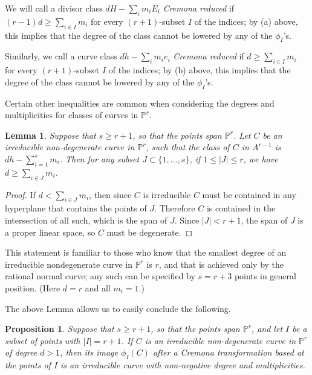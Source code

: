 \documentclass[12pt]{article}
\numberwithin{equation}{section}
\newtheorem{lemma}[equation]{Lemma}
\newtheorem{proposition}[equation]{Proposition}
\numberwithin{equation}{section}
\numberwithin{subeq}{equation}
\def\bbP{\mathbb{P}}
\begin{document}
We will call a divisor class $dH-\sum_i m_i E_i$ \emph{Cremona reduced}
if $(r-1)d \geq \sum_{i \in I} m_i$ for every $(r+1)$-subset $I$ of the indices;
by (a) above, this implies that the degree of the class cannot be lowered
by any of the $\phi_I$'s.

Similarly, we call a curve class $dh-\sum_i m_i e_i$ \emph{Cremona reduced}
if $d \geq \sum_{i \in I} m_i$ for every $(r+1)$-subset $I$ of the indices;
by (b) above, this implies that the degree of the class cannot be lowered
by any of the $\phi_I$'s.

Certain other inequalities are common
when considering the degrees and multiplicities for classes of curves in $\bbP^r$.

\begin{lemma}\label{irrednondeg}
Suppose that $s \geq r+1$,
so that the points span $\bbP^r$.
Let $C$ be an irreducible non-degenerate curve in $\bbP^r$,
such that the class of $C$ in $A^{r-1}$ is $dh-\sum_{i=1}^s m_i$.
Then for any subset $J \subset \{1,\ldots,s\}$, if $1 \leq |J| \leq r$, we have
$d \geq \sum_{i \in J} m_i$.
\end{lemma}

\begin{proof}
If $d < \sum_{i \in J} m_i$, then since $C$ is irreducible
$C$ must be contained in any hyperplane that contains the points of $J$.
Therefore $C$ is contained in the intersection of all such,
which is the span of $J$.
Since $|J| < r+1$, the span of $J$ is a proper linear space,
so $C$ must be degenerate.
\end{proof}

This statement is familiar to those who know that the smallest degree of an irreducible nondegenerate curve in $\bbP^r$ is $r$, and that is achieved only by the rational normal curve; any such can be specified by $s=r+3$ points in general position.
(Here $d=r$ and all $m_i=1$.)

The above Lemma allows us to easily conclude the following.

\begin{proposition}
Suppose that $s \geq r+1$,
so that the points span $\bbP^r$,
and let $I$ be a subset of points with $|I|=r+1$.
If $C$ is an irreducible non-degenerate curve in $\bbP^r$ of degree $d > 1$,
then its image $\phi_I(C)$ after a Cremona transformation based at the points of $I$
is an irreducible curve with non-negative degree and multiplicities.
\end{proposition}
\end{document}
